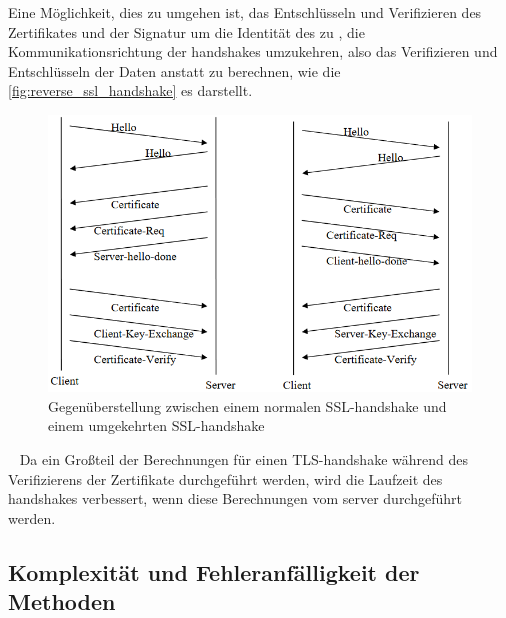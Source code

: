 Eine Möglichkeit, dies zu umgehen ist, das Entschlüsseln und Verifizieren des Zertifikates und der Signatur um die Identität des  zu , die Kommunikationsrichtung der \glspl{handshake} umzukehren, also das Verifizieren und Entschlüsseln der Daten  anstatt  zu berechnen\autocite[\vglf][]{cryptoeprint:2006/212}, wie die \autoref{fig:reverse_ssl_handshake}\autocite[]{cryptoeprint:2006/212} es darstellt.
\begin{figure}[htpb]
    \centering
    \includegraphics[width=1\linewidth]{abbildungen/reverse_ssl_handshake}
    \caption[Gegenüberstellung zwischen einem normalen SSL-Handshake und einem umgekehrten SSL-Handshake]{Gegenüberstellung zwischen einem normalen \ac{SSL}-\gls{handshake} und einem umgekehrten \ac{SSL}-\gls{handshake}\footnotemark}
    \label{fig:reverse_ssl_handshake}
\end{figure}~
Da ein Großteil der Berechnungen für einen \ac{TLS}-\gls{handshake} während des Verifizierens der Zertifikate durchgeführt werden, wird die Laufzeit des \glspl{handshake} verbessert, wenn diese Berechnungen vom \gls{server} durchgeführt werden.

\subsection[Komplexität und Fehleranfälligkeit der Kryptografischen Methoden]{Komplexität und Fehleranfälligkeit der  Methoden}\label{subsec:komplexitaet_und_fehleranfaelligkeit_der_kryptografie}

